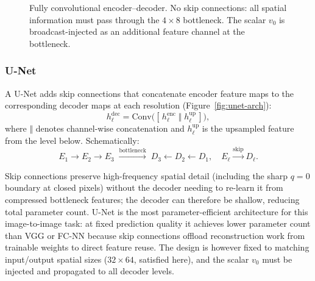 \documentclass[conference,compsoc]{IEEEtran}
\begin{document}
\begin{figure}[htbp]
\centering
{}
\caption{Fully convolutional encoder--decoder. No skip connections: all spatial information must pass through the $4{\times}8$ bottleneck. The scalar $v_0$ is broadcast-injected as an additional feature channel at the bottleneck.}
\label{fig:fcnn-arch}
\end{figure}

\subsubsection{U-Net}

A U-Net adds skip connections that concatenate encoder feature maps to the corresponding decoder maps at each resolution (Figure~\ref{fig:unet-arch}):
\begin{equation}
  h_\ell^\mathrm{dec} = \mathrm{Conv}\!\bigl([\,h_\ell^\mathrm{enc}\;\Vert\;h_\ell^\mathrm{up}\,]\bigr),
  \label{eq:skip}
\end{equation}
where $\Vert$ denotes channel-wise concatenation and $h_\ell^\mathrm{up}$ is the upsampled feature from the level below. Schematically:
\[
E_1\!\to\!E_2\!\to\!E_3 \;\xrightarrow{\mathrm{bottleneck}}\; D_3\!\leftarrow\!D_2\!\leftarrow\!D_1,
\quad E_\ell\!\xrightarrow{\mathrm{skip}}\!D_\ell.
\]

Skip connections preserve high-frequency spatial detail (including the sharp $q=0$ boundary at closed pixels) without the decoder needing to re-learn it from compressed bottleneck features; the decoder can therefore be shallow, reducing total parameter count. U-Net is the most parameter-efficient architecture for this image-to-image task: at fixed prediction quality it achieves lower parameter count than VGG or FC-NN because skip connections offload reconstruction work from trainable weights to direct feature reuse. The design is however fixed to matching input/output spatial sizes ($32\times64$, satisfied here), and the scalar $v_0$ must be injected and propagated to all decoder levels.
\end{document}
